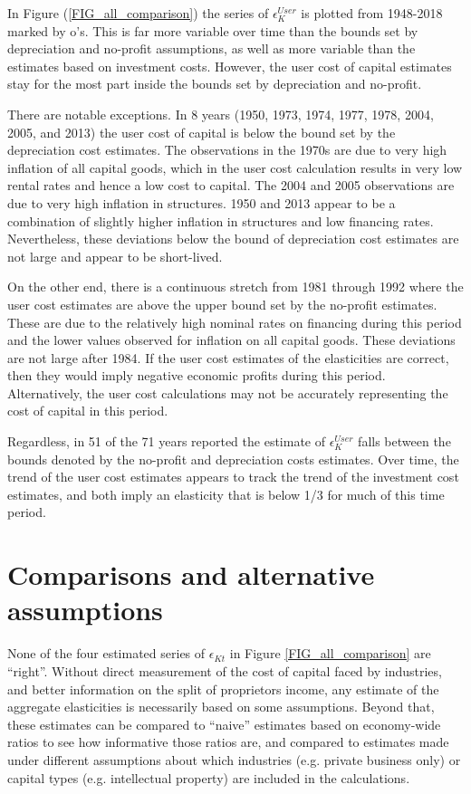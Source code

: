 \documentclass[11pt]{article}
\begin{document}
In Figure (\ref{FIG_all_comparison}) the series of $\epsilon_K^{User}$ is plotted from 1948-2018 marked by o's. This is far more variable over time than the bounds set by depreciation and no-profit assumptions, as well as more variable than the estimates based on investment costs. However, the user cost of capital estimates stay for the most part inside the bounds set by depreciation and no-profit.

There are notable exceptions. In 8 years (1950, 1973, 1974, 1977, 1978, 2004, 2005, and 2013) the user cost of capital is below the bound set by the depreciation cost estimates. The observations in the 1970s are due to very high inflation of all capital goods, which in the user cost calculation results in very low rental rates and hence a low cost to capital. The 2004 and 2005 observations are due to very high inflation in structures. 1950 and 2013 appear to be a combination of slightly higher inflation in structures and low financing rates. Nevertheless, these deviations below the bound of depreciation cost estimates are not large and appear to be short-lived. 

On the other end, there is a continuous stretch from 1981 through 1992 where the user cost estimates are above the upper bound set by the no-profit estimates. These are due to the relatively high nominal rates on financing during this period and the lower values observed for inflation on all capital goods. These deviations are not large after 1984. If the user cost estimates of the elasticities are correct, then they would imply negative economic profits during this period. Alternatively, the user cost calculations may not be accurately representing the cost of capital in this period.

Regardless, in 51 of the 71 years reported the estimate of $\epsilon_K^{User}$ falls between the bounds denoted by the no-profit and depreciation costs estimates. Over time, the trend of the user cost estimates appears to track the trend of the investment cost estimates, and both imply an elasticity that is below 1/3 for much of this time period. 

\section{Comparisons and alternative assumptions}\label{SEC_trends}
None of the four estimated series of $\epsilon_{Kt}$ in Figure \ref{FIG_all_comparison} are ``right''. Without direct measurement of the cost of capital faced by industries, and better information on the split of proprietors income, any estimate of the aggregate elasticities is necessarily based on some assumptions. Beyond that, these estimates can be compared to ``naive'' estimates based on economy-wide ratios to see how informative those ratios are, and compared to estimates made under different assumptions about which industries (e.g. private business only) or capital types (e.g. intellectual property) are included in the calculations.
\end{document}
